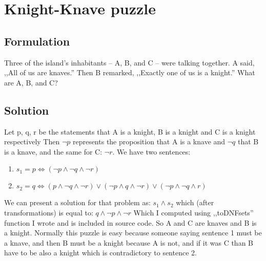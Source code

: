 \documentclass[12pt]{article}
\begin{document}
\maketitle

\section{Knight-Knave puzzle}
\subsection{Formulation}
Three of the island's inhabitants – A, B, and C – were talking together. 
A said, ,,All of us are knaves.'' Then B remarked, ,,Exactly one of us is a knight.'' 
What are A, B, and C?
\subsection{Solution}
Let p, q, r be the statements that A is a knight, B is a knight and C is a knight respectively
Then $\neg p$ represents the proposition that A is a knave and $\neg q$ that B is a knave, and the same for C: $\neg r$.
We have two sentences:
\begin{enumerate}
\item $ s_1 = p \iff (\neg p \land \neg q  \land \neg r) $
\item $ s_2 = q \iff (p  \land \neg q  \land \neg r) \vee (\neg p  \land q  \land \neg r) \vee (\neg p  \land \neg q  \land r) $
\end{enumerate}
We can present a solution for that problem as: $ s_1 \land s_2$ which (after transformations) is equal to: $ q  \land \neg p \land \neg r $
Which I computed using ,,toDNFsets'' function I wrote and is included in source code. So A and C are knaves and B is a knight.
Normally this puzzle is easy because someone saying sentence 1 must be a knave, and then B must be a knight because A is not, and
if it was C than B have to be also a knight which is contradictory to sentence 2. 
\end{document}
